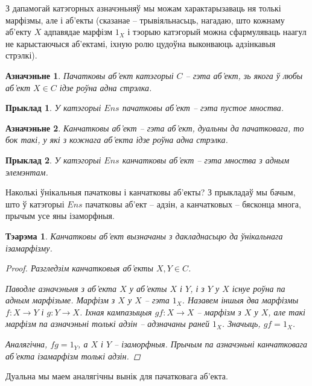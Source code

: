 \documentclass[a4paper,12pt]{book}
\newtheorem{theorem}{Тэарэма}[section]
\newtheorem{example}{Прыклад}[section]
\newtheorem{definition}{Азначэньне}[section]
\begin{document}
З дапамогай катэгорных азначэньняў мы можам характарызаваць ня толькі
марфізмы, але і аб'екты (сказанае -- трывіяльнасьць, нагадаю, што
кожнаму аб'екту $X$ адпавядае марфізм $1_X$ і тэорыю катэгорый можна
сфармуляваць наагул не карыстаючыся аб'ектамі, іхную ролю цудоўна
выконваюць адзінкавыя стрэлкі).

\begin{definition}
  Пачатковы аб'ект катэгорыі $C$ -- гэта аб'ект, зь якога ў любы
  аб'ект $X \in C$ ідзе роўна адна стрэлка.
\end{definition}

\begin{example}
  У катэгорыі $Ens$ пачатковы аб'ект -- гэта пустое мноства.
\end{example}

\begin{definition}
  Канчатковы аб'ект -- гэта аб'ект, дуальны да пачатковага, то бок
  такі, у які з кожнага аб'екта ідзе роўна адна стрэлка.
\end{definition}

\begin{example}
  У катэгорыі $Ens$ канчатковы аб'ект -- гэта мноства з адным элемэнтам.
\end{example}

Наколькі ўнікальныя пачатковы і канчатковы аб'екты? З прыкладаў мы
бачым, што ў катэгорыі $Ens$ пачатковы аб'ект -- адзін, а канчатковых
-- бясконца многа, прычым усе яны ізаморфныя.

\begin{theorem}
  Канчатковы аб'ект вызначаны з дакладнасьцю да ўнікальнага
  ізамарфізму.
  \begin{proof}
    Разгледзім канчатковыя аб'екты $X, Y \in C$.

    Паводле азначэньня з
    аб'екта $X$ у аб'екты $X$ і $Y$, і з $Y$ у $X$ існуе роўна па адным
    марфізьме. Марфізм з $X$ у $X$ -- гэта $1_X$. Назавем іншыя два
    марфізмы $f: X \rightarrow Y$ і $g:Y \rightarrow X$. Іхная
    кампазыцыя $gf: X \rightarrow X$ -- марфізм з $X$ у $X$, але такі
    марфізм па азначэньні толькі адзін -- адзначаны раней
    $1_X$. Значыць, $gf = 1_X$.

    Аналягічна, $fg = 1_Y$, а $X$ і $Y$ -- ізаморфныя. Прычым па
    азначэньні канчатковага аб'екта ізамарфізм толькі адзін.
  \end{proof}
\end{theorem}

Дуальна мы маем аналягічны вынік для пачатковага аб'екта.
\end{document}
